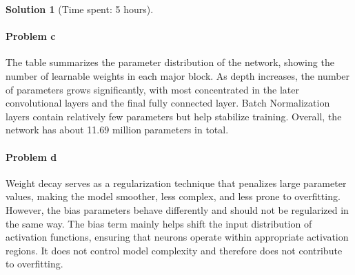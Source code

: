 \documentclass[11pt, reqno, letterpaper, twoside]{amsart}
\theoremstyle{plain}
\theoremstyle{definition}
\newtheorem{solution}[theorem]{Solution}
\begin{document}
\begin{solution}[Time spent: 5 hours]
\paragraph{\textbf{Problem c}} 
The table summarizes the parameter distribution of the network, showing the number of learnable weights in each major block. As depth increases, the number of parameters grows significantly, with most concentrated in the later convolutional layers and the final fully connected layer. 
Batch Normalization layers contain relatively few parameters but help stabilize training. Overall, the network has about 11.69 million parameters in total.\\
\begin{table}[H]
\centering
\small
\setlength{\tabcolsep}{6pt}
\renewcommand{\arraystretch}{1.1}
\caption{Condensed layer-wise parameter summary of the network.}
\label{tab:params-condensed}
\end{table}

\paragraph{\textbf{Problem d}} 
Weight decay serves as a regularization technique that penalizes large parameter values,
making the model smoother, less complex, and less prone to overfitting.
However, the bias parameters behave differently and should not be regularized in the same way.
The bias term mainly helps shift the input distribution of activation functions,
ensuring that neurons operate within appropriate activation regions.
It does not control model complexity and therefore does not contribute to overfitting.


\end{solution}
\end{document}
